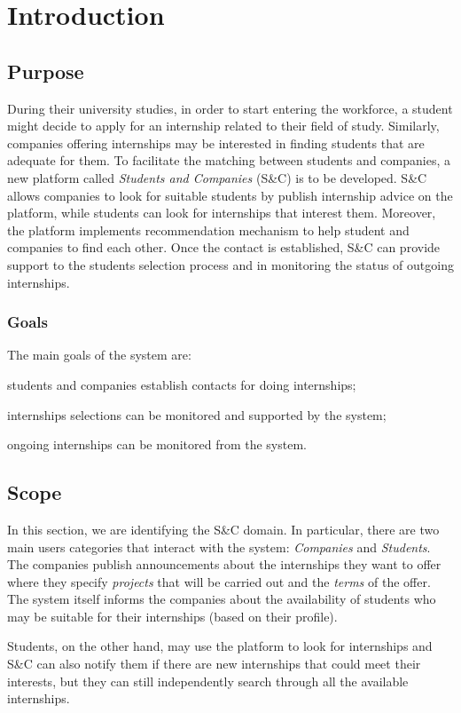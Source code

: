 \chapter{Introduction}
	\section{Purpose}
		During their university studies, in order to start entering the workforce, a student might decide to apply for an internship related to their field of study. Similarly, companies offering internships may be interested in finding students that are adequate for them. To facilitate the matching between students and companies, a new platform called \emph{Students and Companies} (S\&C) is to be developed. S\&C allows companies to look for suitable students by publish internship advice on the platform, while students can look for internships that interest them. Moreover, the platform implements recommendation mechanism to help student and companies to find each other. Once the contact is established, S\&C can provide support to the students selection process and in monitoring the status of outgoing internships.
		\subsection{Goals}
			The main goals of the system are:
			
			\quad [G1]\quad students and companies establish contacts for doing internships;
			
			\quad [G2]\quad internships selections can be monitored and supported by the system;
			
			\quad [G3]\quad ongoing internships can be monitored from the system.
	\section{Scope}
		In this section, we are identifying the S\&C domain. In particular, there are two main users categories that interact with the system: \emph{Companies} and \emph{Students}. The companies publish announcements about the internships they want to offer where they specify \emph{projects} that will be carried out and the \emph{terms} of the offer. The system itself informs the companies about the availability of students who may be suitable for their internships (based on their profile).
		
		Students, on the other hand, may use the platform to look for internships and S\&C can also notify them if there are new internships that could meet their interests, but they can still independently search through all the available internships.
		
